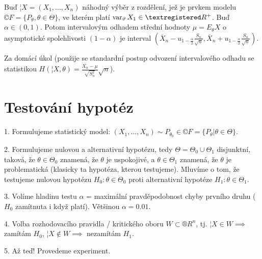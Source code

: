 \documentclass[12pt]{article}					%
\begin{document}

\begin{veta}
	Buď $¦X = (X_1, …, X_n)$ náhodný výběr z rozdělení, jež je prvkem modelu $©F = \{P_\theta, \theta \in \Theta\}$, ve kterém platí $\var_\theta X_1 \in ®R^+$. Buď $\alpha \in (0, 1)$. Potom intervalovým odhadem střední hodnoty $\mu = E_\theta X$ o asymptotické spolehlivosti $(1 - \alpha)$ je interval $(\overline{X}_n - u_{1 - \frac{\alpha}{2}} \frac{S_n}{\sqrt{n}}, \overline{X}_n + u_{1 - \frac{\alpha}{2}} \frac{S_n}{\sqrt{n}})$.

	\begin{dukazin}
		Za domácí úkol (použije se standardní postup odvození intervalového odhadu se statistikou $H(¦X, \theta) = \frac{\overline{X_n} - \mu}{\sqrt{S_n^2}} \sqrt{n}$).
	\end{dukazin}
\end{veta}

\section{Testování hypotéz}
\begin{poznamka}
	1. Formulujeme statistický model: $(X_1, …, X_n) \sim P_{\theta_0} \in ©F = \{P_\theta | \theta \in \Theta\}$.

	2. Formulujeme nulovou a alternativní hypotézu, tedy $\Theta = \Theta_0 \cup \Theta_1$ disjunktní, taková, že $\theta \in \Theta_0$ znamená, že $\theta$ je uspokojivé, a $\theta \in \Theta_1$ znamená, že $\theta$ je problematická (klasicky ta hypotéza, kterou testujeme). Mluvíme o tom, že testujeme nulovou hypotézu $H_0: \theta \in \Theta_0$ proti alternativní hypotéze $H_1: \theta \in \Theta_1$.

	3. Volíme hladinu testu $\alpha$ = maximální pravděpodobnost chyby prvního druhu ($H_0$ zamítnuta i když platí). Většinou $\alpha = 0.01$.

	4. Volba rozhodovacího pravidla / kritického oboru $W \subset ®R^n$, tj. $¦X \in W \implies$ zamítám $H_0$, $¦X \notin W \implies$ nezamítám $H_1$.

	5. Až teď! Provedeme experiment.
\end{poznamka}
\end{document}
